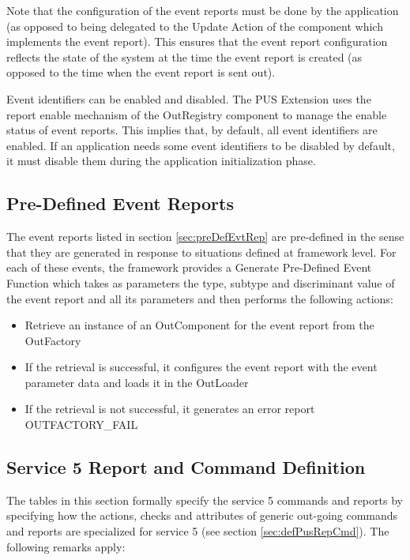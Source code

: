 \documentclass{pnp_article}
\begin{document}
Note that the configuration of the event reports must be done by the application (as opposed to being delegated to the Update Action of the component which implements the event report). This ensures that the event report configuration reflects the state of the system at the time the event report is created (as opposed to the time when the event report is sent out).  

Event identifiers can be enabled and disabled. The PUS Extension uses the report enable mechanism of the OutRegistry component to manage the enable status of event reports. This implies that, by default, all event identifiers are enabled. If an application needs some event identifiers to be disabled by default, it must disable them during the application initialization phase.

\subsection{Pre-Defined Event Reports}\label{sec:serv5PreDefEvtRep}
The event reports listed in section \ref{sec:preDefEvtRep} are pre-defined in the sense that they are generated in response to situations defined at framework level. For each of these events, the framework provides a Generate Pre-Defined Event Function which takes as parameters the type, subtype and discriminant value of the event report and all its parameters and then performs the following actions:

\begin{itemize}
\item Retrieve an instance of an OutComponent for the event report from the OutFactory
\item If the retrieval is successful, it configures the event report with the event parameter data and loads it in the OutLoader
\item If the retrieval is not successful, it generates an error report OUTFACTORY\_FAIL
\end{itemize}


\subsection{Service 5 Report and Command Definition}\label{sec:serv5RepCmdDef}
The tables in this section formally specify the service 5 commands and reports by specifying how the actions, checks and attributes of generic out-going commands and reports are specialized for service 5 (see section \ref{sec:defPusRepCmd}). The following remarks apply:
\end{document}
